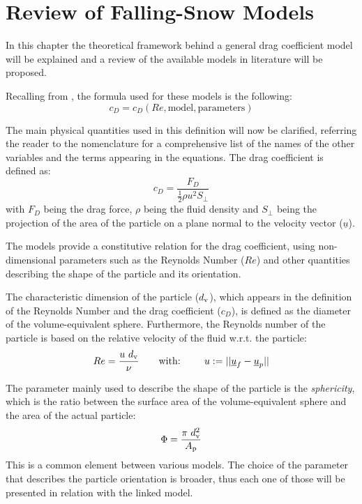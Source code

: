 
\chapter{Review of Falling-Snow Models}
	In this chapter the theoretical framework behind a general drag coefficient model will be explained and a review of the available models in literature will be proposed. 
	
	Recalling from , the formula used for these models is the following:
	\begin{equation}
		c_D = c_D(Re, \text{model}, \text{parameters})
	\end{equation}
	
	The main physical quantities used in this definition will now be clarified, referring the reader to the nomenclature for a comprehensive list of the names of the other variables and the terms appearing in the equations.
	The drag coefficient is defined as:
	\begin{equation}
		c_D = \dfrac{F_D}{\frac{1}{2} \rho u^2 S_{\perp}}
	\end{equation}
	with $ F_D $ being the drag force, $ \rho $ being the fluid density and $ S_{\perp} $ being the projection of the area of the particle on a plane normal to the velocity vector ($ \underline{u} $).
	
	The models provide a constitutive relation for the drag coefficient, using non-dimensional parameters such as the Reynolds Number ($ Re $) and other quantities describing the shape of the particle and its orientation.
	 
	The characteristic dimension of the particle ($ d_{\textup{v}} $), which appears in the definition of the Reynolds Number and the drag coefficient ($ c_D $), is defined as the diameter of the volume-equivalent sphere. Furthermore, the Reynolds number of the particle is based on the relative velocity of the fluid w.r.t. the particle:
	\begin{equation}
		Re = \dfrac{u \ d_{\textup{v}}}{\nu} \qquad \text{with: } \qquad u := || \underline{u}_f - \underline{u}_p ||
	\end{equation}

	The parameter mainly used to describe the shape of the particle is the \textit{sphericity}, which is the ratio between the surface area of the
	volume-equivalent sphere and the area of the actual particle:
	\begin{equation}
		\Phi = \dfrac{\pi \ d_{\textup{v}}^2} {A_{\textup{p}}}
	\end{equation}
	This is a common element between various models. The choice of the parameter that describes the particle orientation is broader, thus each one of those will be presented in relation with the linked model.
	
